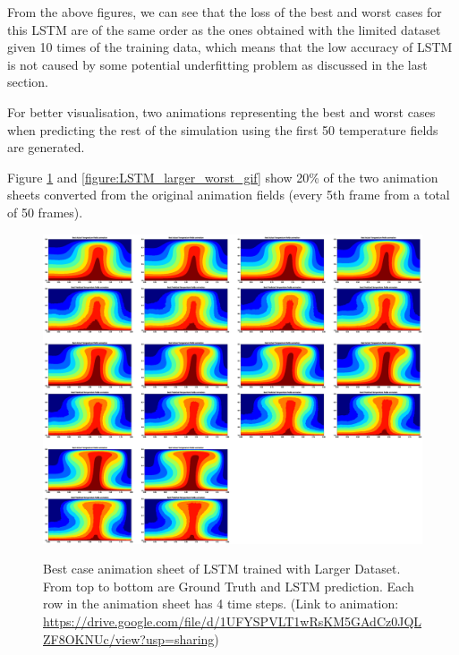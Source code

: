 From the above figures, we can see that the loss of the best and worst cases for this LSTM are of the same order as the ones obtained with the limited dataset given 10 times of the training data, which means that the low accuracy of LSTM is not caused by some potential underfitting problem as discussed in the last section.

For better visualisation, two animations representing the best and worst cases when predicting the rest of the simulation using the first 50 temperature fields are generated.

Figure \ref{figure:LSTM_larger_best_gif} and \ref{figure:LSTM_larger_worst_gif} show 20\% of the two animation sheets converted from the original animation fields (every 5th frame from a total of 50 frames).

\begin{figure}[H]
    \centering
    \caption{Best case animation sheet of LSTM trained with Larger Dataset. From top to bottom are Ground Truth and LSTM prediction. Each row in the animation sheet has 4 time steps. (Link to animation: \url{https://drive.google.com/file/d/1UFYSPVLT1wRsKM5GAdCz0JQLZF8OKNUc/view?usp=sharing})}
    \includegraphics[scale=0.15]{figures/mantle_convection_images/larger_dataset/LSTM_Best_GIF_sheet.png}
    \label{figure:LSTM_larger_best_gif}
\end{figure}



